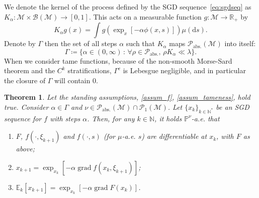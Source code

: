 \documentclass{article}
\newtheorem{theorem}{Theorem}
\newcommand{\CM}{\mathcal{M}}
\newcommand{\BR}{\mathbb{R}}
\newcommand{\BN}{\mathbb{N}}
\newcommand{\rd}{\mathrm{d}}
\DeclareMathOperator{\grad}{grad}
\begin{document}
We denote the kernel of the process defined by the SGD sequence~\eqref{eq:sgdseq} as $K_\alpha:\CM\times\mathcal{B}(\CM)\to[0,1]$. This acts on a measurable function $g:\CM\to\BR_+$ by
\begin{equation}
    K_\alpha g(x)=\int g(\exp_x\left[-\alpha\phi(x,s)\right])\mu(\rd s).
\end{equation}
Denote by $\Gamma$ then the set of all steps $\alpha$ such that $K_\alpha$ maps $\mathcal{P}_{\text{abs.}}(\CM)$ into itself:
\begin{equation}
    \Gamma\coloneqq \{ \alpha\in(0,\infty)\,:\,\forall\rho\in\mathcal{P}_{\text{abs.}},\,\rho K_\alpha\ll\lambda\}.
\end{equation}
When we consider tame functions, because of the non-smooth Morse-Sard theorem and the $C^k$ stratifications, $\Gamma^c$ is Lebesgue negligible, and in particular the closure of $\Gamma$ will contain $0$. 





\begin{theorem}\label{th:tight}
    Let the standing assumptions, \ref{assum_f}, \ref{assum_tameness}, hold true. Consider $\alpha\in\Gamma$ and $\nu\in\mathcal{P}_{\text{abs.}}(\CM)\cap\mathcal{P}_1(\CM)$. Let $\{x_k\}_{k\in\BN^*}$ be an SGD sequence for $f$ with steps $\alpha$. Then, for any $k\in\BN$, it holds $\mathbb{P}^\nu$-a.e. that 
    \begin{enumerate}
        \item $F$, $f(\cdot,\xi_{k+1})$ and $f(\cdot,s)$ (for $\mu$-a.e. $s$) are differentiable at $x_k$, with $F$ as above;
        \item $x_{k+1}=\exp_{x_k}\left[-\alpha\grad f(x_k,\xi_{k+1})\right]$;
        \item $\mathbb{E}_k[x_{k+1}]=\exp_{x_k}\left[-\alpha\grad F(x_k)\right]$.
    \end{enumerate}
\end{theorem}
\end{document}
